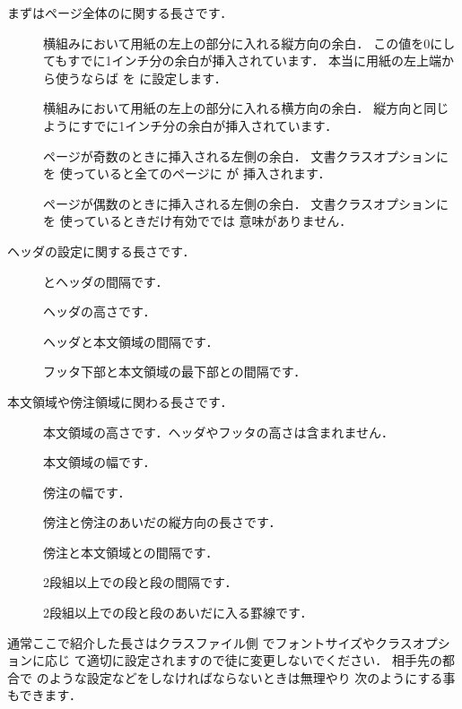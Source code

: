 まずはページ全体のに関する長さです．
\begin{description}
 \item[] 
 横組みにおいて用紙の左上の部分に入れる縦方向の余白．
 この値を0にしてもすでに1インチ分の余白が挿入されています．
 本当に用紙の左上端から使うならば を
 \qu{\str{-1in}}に設定します．

 \item[] 
 横組みにおいて用紙の左上の部分に入れる横方向の余白．
 縦方向と同じようにすでに1インチ分の余白が挿入されています．

 \item[]
ページが奇数のときに挿入される左側の余白．
文書クラスオプションにを
使っていると全てのページに が
挿入されます．

 \item[] 
ページが偶数のときに挿入される左側の余白．
文書クラスオプションにを
使っているときだけ有効ででは
意味がありません．
\end{description}

ヘッダの設定に関する長さです．
\begin{description}
\item[] 
とヘッダの間隔です．
\item[]
ヘッダの高さです．%
\item[]
ヘッダと本文領域の間隔です．
\item[]
フッタ下部と本文領域の最下部との間隔です．
\end{description}

本文領域や傍注領域に関わる長さです．
\begin{description}
\item[]%
 本文領域の高さです．ヘッダやフッタの高さは含まれません．
 \item[]
 本文領域の幅です．%
 \item[]
  傍注の幅です．%
 \item[]
 傍注と傍注のあいだの縦方向の長さです．
 \item[]
 傍注と本文領域との間隔です．
 \item[]
 2段組以上での段と段の間隔です．
 \item[]
 2段組以上での段と段のあいだに入る罫線です．
\end{description}
通常ここで紹介した長さはクラスファイル側
でフォントサイズやクラスオプションに応じ
て適切に設定されますので徒に変更しないでください．
相手先の都合で
のような設定などをしなければならないときは無理やり
次のようにする事もできます．

